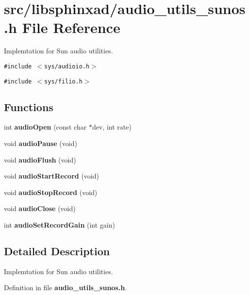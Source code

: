 \section{src/libsphinxad/audio\_\-utils\_\-sunos.h File Reference}
\label{audio__utils__sunos_8h}
Implemtation for Sun audio utilities.  


{\tt \#include $<$sys/audioio.h$>$}\par
{\tt \#include $<$sys/filio.h$>$}\par
\subsection*{Functions}
\begin{CompactItemize}
\item 
int \textbf{audioOpen} (const char $\ast$dev, int rate)\label{audio__utils__sunos_8h_1c2f842b06424256d46dc930b2df2ac7}

\item 
void \textbf{audioPause} (void)\label{audio__utils__sunos_8h_3c36756e01944a21cd116f845a0192f9}

\item 
void \textbf{audioFlush} (void)\label{audio__utils__sunos_8h_3b8ff906e10285a64c1f78ba160a2349}

\item 
void \textbf{audioStartRecord} (void)\label{audio__utils__sunos_8h_7a3b2fb58ef7fa179bceb737335465ec}

\item 
void \textbf{audioStopRecord} (void)\label{audio__utils__sunos_8h_c3350f3f057e4cba5669ad8b0723a500}

\item 
void \textbf{audioClose} (void)\label{audio__utils__sunos_8h_2ddd50c6ba6bcc4c63132cf1dab6b644}

\item 
int \textbf{audioSetRecordGain} (int gain)\label{audio__utils__sunos_8h_aa8bb7d093daf454ef50074ba639142c}

\end{CompactItemize}


\subsection{Detailed Description}
Implemtation for Sun audio utilities. 



Definition in file {\bf audio\_\-utils\_\-sunos.h}.